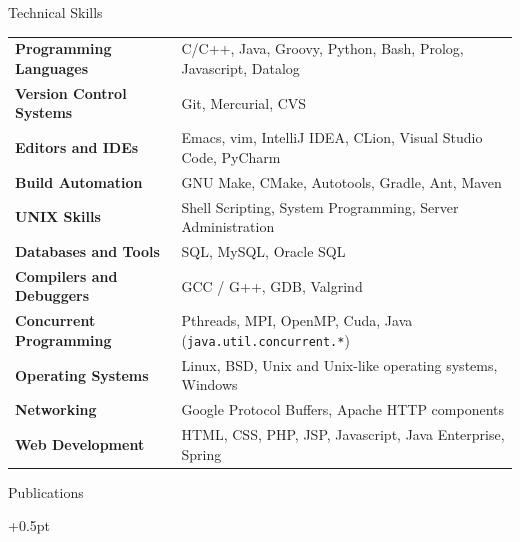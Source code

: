 \documentclass{resume}
\begin{document}
\begin{rSection}{Technical Skills}

{\renewcommand{\arraystretch}{1.3}
\begin{tabular}{ @{} >{\bfseries}l @{\hspace{6ex}} l }

Programming Languages
& C/C++, Java, Groovy, Python, Bash, Prolog, Javascript, Datalog \\

Version Control Systems
   & Git, Mercurial, CVS \\

Editors and IDEs
   & Emacs, vim, IntelliJ IDEA, CLion, Visual Studio Code, PyCharm \\

Build Automation
   & GNU Make, CMake, Autotools, Gradle, Ant, Maven \\

UNIX Skills
   & Shell Scripting, System Programming, Server Administration \\

Databases and Tools
   & SQL, MySQL, Oracle SQL \\

Compilers and Debuggers
   & GCC / G++, GDB, Valgrind \\

Concurrent Programming
   & Pthreads, MPI, OpenMP, Cuda, Java (\texttt{java.util.concurrent.*}) \\

Operating Systems
   & Linux, BSD, Unix and Unix-like operating systems, Windows \\

Networking
   & Google Protocol Buffers, Apache HTTP components \\

Web Development
   & HTML, CSS, PHP, JSP, Javascript, Java Enterprise, Spring \\

\end{tabular}}
\end{rSection}


\begin{rSection}{Publications}
  \begin{rSubsection}{}{}{}{}
    \itemsep +0.5pt %
  \item {}
  \item {}
  \item {}
  \end{rSubsection}
\end{rSection}
\end{document}

